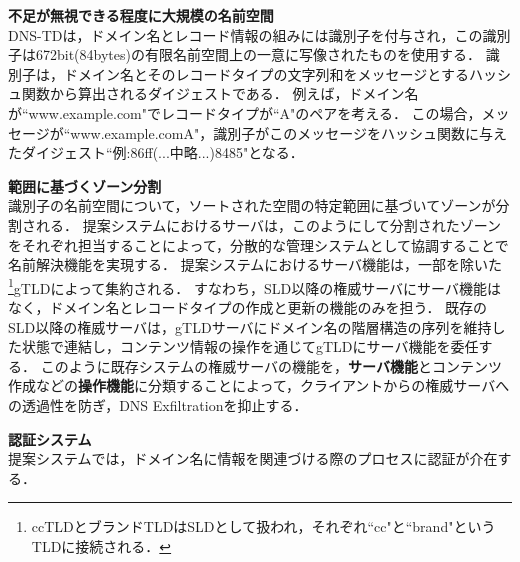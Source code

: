 \textbf{不足が無視できる程度に大規模の名前空間}\\
DNS-TDは，ドメイン名とレコード情報の組みには識別子を付与され，この識別子は672bit(84bytes)の有限名前空間上の一意に写像されたものを使用する．
識別子は，ドメイン名とそのレコードタイプの文字列和をメッセージとするハッシュ関数から算出されるダイジェストである．
例えば，ドメイン名が``www.example.com"でレコードタイプが``A"のペアを考える．
この場合，メッセージが``www.example.comA"，識別子がこのメッセージをハッシュ関数に与えたダイジェスト``例:86ff(...中略...)8485"となる．\newline

\textbf{範囲に基づくゾーン分割}\\
識別子の名前空間について，ソートされた空間の特定範囲に基づいてゾーンが分割される．
提案システムにおけるサーバは，このようにして分割されたゾーンをそれぞれ担当することによって，分散的な管理システムとして協調することで名前解決機能を実現する．
提案システムにおけるサーバ機能は，一部を除いた\footnote{ccTLDとブランドTLDはSLDとして扱われ，それぞれ``cc"と``brand"というTLDに接続される．}gTLDによって集約される．
すなわち，SLD以降の権威サーバにサーバ機能はなく，ドメイン名とレコードタイプの作成と更新の機能のみを担う．
既存のSLD以降の権威サーバは，gTLDサーバにドメイン名の階層構造の序列を維持した状態で連結し，コンテンツ情報の操作を通じてgTLDにサーバ機能を委任する．
このように既存システムの権威サーバの機能を，\textbf{サーバ機能}とコンテンツ作成などの\textbf{操作機能}に分類することによって，クライアントからの権威サーバへの透過性を防ぎ，DNS Exfiltrationを抑止する．\newline

\textbf{認証システム}\\
提案システムでは，ドメイン名に情報を関連づける際のプロセスに認証が介在する．




